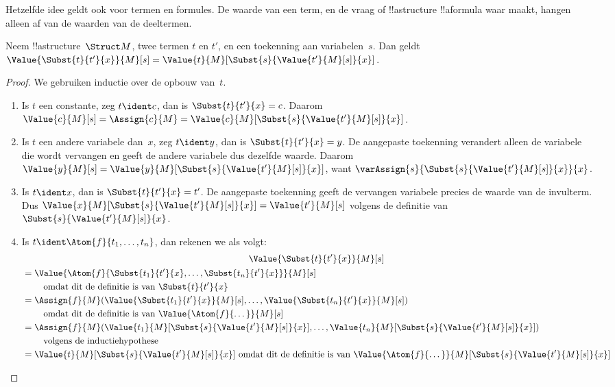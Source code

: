 \documentclass[openany]{memoir}
\begin{document}
Hetzelfde idee geldt ook voor termen en formules. De waarde van een
term, en de vraag of !!a{structure} !!a{formula} waar maakt, hangen
alleen af van de waarden van de deeltermen.

\begin{prop}
Neem !!a{structure}~$\Struct M$, twee termen $t$ en $t'$, en een
toekenning aan variabelen~$s$. Dan geldt
$\Value{\Subst{t}{t'}{x}}{M}[s] =
\Value{t}{M}[\Subst{s}{\Value{t'}{M}[s]}{x}]$.
\end{prop}

\begin{proof}
We gebruiken inductie over de opbouw van~$t$.
\begin{enumerate}
\item Is $t$ een constante, zeg $t\ident c$, dan is
  $\Subst{t}{t'}{x} = c$. Daarom
  $\Value{c}{M}[s] = \Assign{c}{M} =
  \Value{c}{M}[\Subst{s}{\Value{t'}{M}[s]}{x}]$.

\item Is $t$ een andere variabele dan~$x$, zeg $t \ident y$, dan is
  $\Subst{t}{t'}{x} = y$. De aangepaste toekenning verandert alleen
  de variabele die wordt vervangen en geeft de andere variabele dus
  dezelfde waarde. Daarom
  $\Value{y}{M}[s] =
  \Value{y}{M}[\Subst{s}{\Value{t'}{M}[s]}{x}]$, want
  $\varAssign{s}{\Subst{s}{\Value{t'}{M}[s]}{x}}{x}$.

\item Is $t \ident x$, dan is $\Subst{t}{t'}{x} = t'$. De aangepaste
  toekenning geeft de vervangen variabele precies de waarde van de
  invulterm. Dus
  $\Value{x}{M}[\Subst{s}{\Value{t'}{M}[s]}{x}] = \Value{t'}{M}[s]$
  volgens de definitie van~$\Subst{s}{\Value{t'}{M}[s]}{x}$.

\item Is $t \ident \Atom{f}{t_1,\dots,t_n}$, dan rekenen we als volgt:
\begin{multline*}
  \Value{\Subst{t}{t'}{x}}{M}[s] \\
  \begin{aligned}[b]
& = \Value{\Atom{f}{\Subst{t_1}{t'}{x}, \dots, \Subst{t_n}{t'}{x}}}{M}[s]\\
& \qquad    \text{ omdat dit de definitie is van $\Subst{t}{t'}{x}$}\\
& = \Assign{f}{M}(\Value{\Subst{t_1}{t'}{x}}{M}[s], \dots,
    \Value{\Subst{t_n}{t'}{x}}{M}[s])\\
    & \qquad  \text{ omdat dit de definitie is van $\Value{\Atom{f}{\dots}}{M}[s]$}\\
& = \Assign{f}{M}(\Value{t_1}{M}[\Subst{s}{\Value{t'}{M}[s]}{x}], \dots,
   \Value{t_n}{M}[\Subst{s}{\Value{t'}{M}[s]}{x}])\\
& \qquad    \text{ volgens de inductiehypothese}\\
& = \Value{t}{M}[\Subst{s}{\Value{t'}{M}[s]}{x}]
    \text{ omdat dit de definitie is van $\Value{\Atom{f}{\dots}}{M}[\Subst{s}{\Value{t'}{M}[s]}{x}]$}
  \end{aligned}
\end{multline*}
\end{enumerate}
\end{proof}
\end{document}
